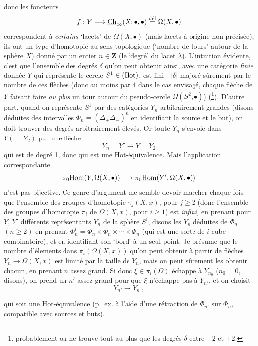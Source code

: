 \clearpage
{}

donc les foncteurs
\[ f : Y\longrightarrow \underline{\mathrm{Ch}}_\infty(X;\bullet,\bullet) \overset{\text{déf}}{=} \Omega(X,\bullet) \]
correspondent à \textit{certains} `lacets' de $\Omega(X,\bullet)$ (mais lacets à origine non précisée), ils ont un type d'homotopie au sens topologique (`nombre de tours' autour de la sphère $X$) donné par un entier $n\in\mathbf{Z}$ (le `degré' du lacet $\lambda$). L'intuition évidente, c'est que l'ensemble des degrés $\delta$ qu'on peut obtenir ainsi, avec une catégorie \textit{finie} donnée $Y$ qui représente le cercle $S^1\in(\mathrm{Hot})$, est fini - $|\delta|$ majoré sûrement par le nombre de ces flèches (donc au moins par 4 dans le cas envisagé, chaque flèche de $Y$ faisant faire \textit{au plus} un tour autour du pseudo-cercle $\Omega(S^2,\bullet)$) (\footnote[28]{probablement on ne trouve tout au plus que les degrés $\delta$ entre $-2$ et $+2$.}). D'autre part, quand on représente $S^1$ par des catégories $Y_n$ arbitrairement grandes (disons déduites des intervalles $\Phi_n=(\Delta_+\Delta_-)^n$ en identifiant la source et le but), on doit trouver des degrés arbitrairement élevés. Or toute $Y_n$ s'envoie dans $Y(=Y_2)$ par une flèche
\[ Y_n = Y' \longrightarrow Y = Y_2 \]
qui est de degré 1, donc qui est une Hot-équivalence. Mais l'application correspondante
\[ \pi_0\underline{\mathrm{Hom}}(Y,\Omega(X,\bullet)) \longrightarrow \pi_0\underline{\mathrm{Hom}}(Y',\Omega(X,\bullet)) \]
n'est pas bijective. Ce genre d'argument me semble devoir marcher chaque fois que l'ensemble des groupes d'homotopie $\pi_j(X,x)$, pour $j\geq 2$ (donc l'ensemble des groupes d'homotopie $\pi_i$ de $\Omega(X,x)$, pour $i\geq 1$) est \textit{infini,} en prenant pour $Y$, $Y'$ différents représentants $Y_n$ de la sphère $S^i$, disons les $Y_n$ déduites de $\Phi_n$ $(n\geq 2)$ en prenant $\Phi_n^i = \Phi_n\times\Phi_n\times\cdots\times\Phi_n$ (qui est une sorte de $i$-cube combinatoire), et en identifiant son `bord' à un seul point. Je présume que le nombre d'élements dans $\pi_i(\Omega(X,x))$ qu'on peut obtenir à partir de flèches $Y_n\longrightarrow\Omega(X,x)$ est limité par la taille de $Y_n$, mais on peut sûrement les obtenir chacun, en prenant $n$ assez grand. Si donc $\xi\in\pi_i(\Omega)$ échappe à $Y_{n_0}$ ($n_0=0$, disons), on prend un $n'$ assez grand pour que $\xi$ n'échappe pas à $Y_{n'}$, et on choisit %
\[ Y_{n'} \longrightarrow Y_n\ , \]


qui soit une Hot-équivalence (p.~ex. à l'aide d'une rétraction de $\Phi_{n'}$ sur $\Phi_n$, compatible avec sources et buts).


